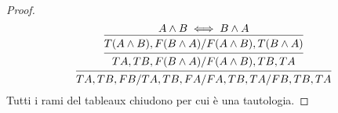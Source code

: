 \begin{proof}
\begin{equation*}
\begin{prooftree}
\hypo{A \land B \iff B \land A}
\infer1 {T (A \land B),F (B \land A)/F (A \land B),T (B \land A)}
\infer1 {TA,TB,F (B \land A)/F (A \land B),TB,TA}
\infer1 {TA,TB,FB/TA,TB,FA/FA,TB,TA/FB,TB,TA}
\end{prooftree}
\end{equation*}
Tutti i rami del tableaux chiudono per cui è una tautologia.
\end{proof}
